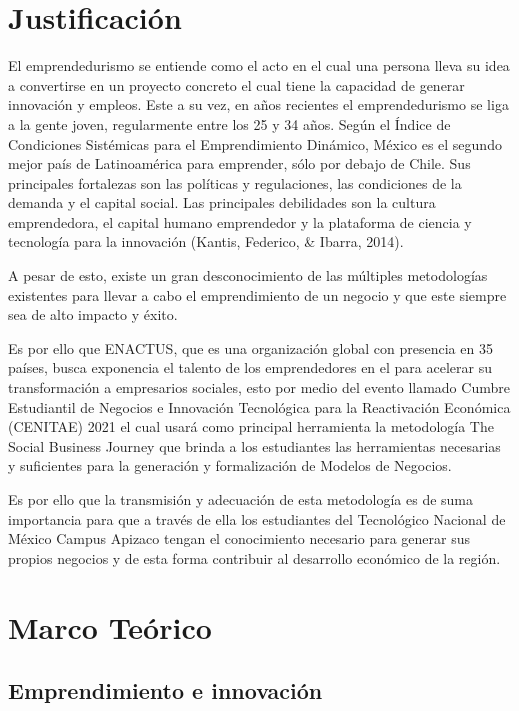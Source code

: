 \documentclass{memoir}
\begin{document}
\chapter{Justificación}
\label{sec:org2dfe519}

El emprendedurismo se entiende como el acto en el cual una persona lleva su idea a convertirse en un proyecto concreto el cual tiene la capacidad de generar innovación y empleos. Este a su vez, en años recientes el emprendedurismo se liga a la gente joven, regularmente entre los 25 y 34 años. Según el Índice de Condiciones Sistémicas para el Emprendimiento Dinámico, México es el segundo mejor país de Latinoamérica para emprender, sólo por debajo de Chile. Sus principales fortalezas son las políticas y regulaciones, las condiciones de la demanda y el capital social. Las principales debilidades son la cultura emprendedora, el capital humano emprendedor y la plataforma de ciencia y tecnología para la innovación (Kantis, Federico, \& Ibarra, 2014).

A pesar de esto, existe un gran desconocimiento de las múltiples metodologías existentes para llevar a cabo el emprendimiento de un negocio y que este siempre sea de alto impacto y éxito.

Es por ello que ENACTUS, que es una organización global con presencia en 35 países, busca exponencia el talento de los emprendedores en el para acelerar su transformación a empresarios sociales, esto por medio del evento llamado Cumbre Estudiantil de Negocios e Innovación Tecnológica para la Reactivación Económica (CENITAE) 2021 el cual usará como principal herramienta la metodología The Social Business Journey que brinda a los estudiantes las herramientas necesarias y suficientes para la generación y formalización de Modelos de Negocios.

Es por ello que la transmisión y adecuación de esta metodología es de suma importancia para que a través de ella los estudiantes del Tecnológico Nacional de México Campus Apizaco tengan el conocimiento necesario para generar sus propios negocios y de esta forma contribuir al desarrollo económico de la región.

\chapter{Marco Teórico}
\label{sec:orgcb99459}

\section{Emprendimiento e innovación}
\label{sec:org9d5f0b3}
\end{document}
